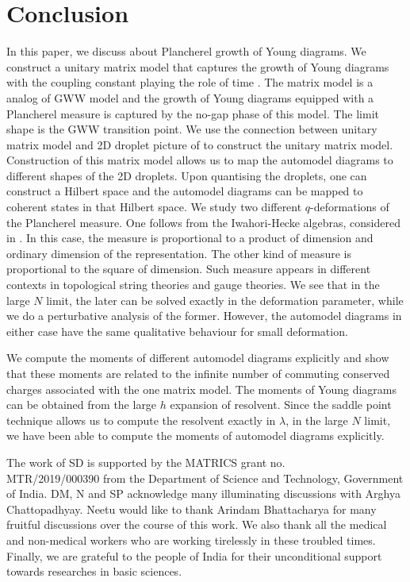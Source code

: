 \documentclass[3p,12pt]{elsarticle}
\numberwithin{equation}{section}
\begin{document}
\section{Conclusion}

In this paper, we discuss about \qd Plancherel growth of Young diagrams. We construct a unitary matrix model that captures the growth of Young diagrams with the coupling constant playing the role of time \cite{Strahov07}. The matrix model is a \qq analog of GWW model and the growth of Young diagrams equipped with a \qd Plancherel measure is captured by the no-gap phase of this model. The \qd limit shape is the \qd GWW transition point. We use the connection between unitary matrix model and 2D droplet picture of \cite{duttagopakumar,Chattopadhyay} to construct the unitary matrix model. Construction of this matrix model allows us to map the automodel diagrams to different shapes of the 2D droplets. Upon quantising the droplets, one can construct a Hilbert space and the automodel diagrams can be mapped to coherent states in that Hilbert space. We study two different $q$-deformations of the Plancherel measure. One follows from the Iwahori-Hecke algebras, considered in \cite{Strahov07,2010arXiv1001.2180F}. In this case, the measure is proportional to a product of \qd dimension and ordinary dimension of the representation. The other kind of \qd measure is proportional to the square of \qq dimension. Such measure appears in different contexts in topological string theories and gauge theories. We see that in the large $N$ limit, the later can be solved exactly in the deformation parameter, while we do a perturbative analysis of the former. However, the automodel diagrams in either case have the same qualitative behaviour for small deformation.

We compute the moments of different automodel diagrams explicitly and show that these moments are related to the infinite number of commuting conserved charges associated with the one matrix model. The moments of Young diagrams can be obtained from the large $h$ expansion of resolvent. Since the saddle point technique allows us to compute the resolvent exactly in $\lambda$, in the large $N$ limit, we have been able to compute the moments of automodel diagrams explicitly. 



\vspace{1cm}

 The work of SD is supported by the MATRICS grant no.          \\    
MTR/2019/000390 from the Department of Science and Technology,
Government of India. DM, N and SP acknowledge many illuminating discussions with Arghya Chattopadhyay. Neetu would like to thank Arindam Bhattacharya for many fruitful discussions over the course of this work. We also thank all the medical and non-medical workers who are working tirelessly in these troubled times. Finally, we are grateful to the people of India for their unconditional support towards researches in basic sciences.
\end{document}
